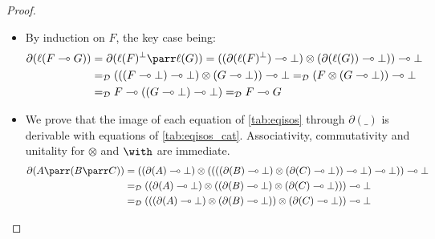 \documentclass{lmcs}
\newcommand*{\orth}{^\perp} %
\newcommand*{\tens}{\otimes} %
\newcommand*{\lolipop}{\multimap} %
\newcommand*{\eqeq}{=} %
\newcommand*{\thD}{\mathcal{D}}
\newcommand*{\isoc}{\eqeq_\thD} %
\newcommand*{\tradm}[1]{\ell(#1)}
\newcommand*{\tradc}[1]{\partial(#1)}
\begin{document}
\begin{proof}
\begin{itemize}
{\begin{align*}
\tradc{(A\oplus B)\orth} &= \tradc{B\orth}\with\tradc{A\orth} \isoc (\tradc{A}\lolipop\bot)\with(\tradc{B}\lolipop\bot) \\
  &\isoc (((\tradc{A}\lolipop\bot)\with(\tradc{B}\lolipop\bot))\lolipop\bot)\lolipop\bot \\
  &= \tradc{A\oplus B}\lolipop\bot \\
\tradc{0\orth} &= \top \isoc (\top\lolipop\bot)\lolipop\bot = \tradc{0}\lolipop\bot \\
\end{align*}
}
\item By induction on $F$, the key case being:
\begin{align*}
\tradc{\tradm{F\lolipop G}} &= \tradc{\tradm{F}\orth\parr\tradm{G}} = ((\tradc{\tradm{F}\orth}\lolipop\bot)\tens(\tradc{\tradm{G}}\lolipop\bot))\lolipop\bot \\
  &\isoc (((F\lolipop\bot)\lolipop\bot)\tens(G\lolipop\bot))\lolipop\bot \isoc (F\tens(G\lolipop\bot))\lolipop\bot\\
  &\isoc F\lolipop((G\lolipop\bot)\lolipop\bot) \isoc F\lolipop G
\end{align*}
\item We prove that the image of each equation of \autoref{tab:eqisos} through $\tradc{\_}$ is derivable with equations of \autoref{tab:eqisos_cat}.
Associativity, commutativity and unitality for $\tens$ and $\with$ are immediate.
{\allowdisplaybreaks
\begin{align*}
\tradc{A\parr(B\parr C)}
  &= ((\tradc{A} \lolipop \bot) \tens ((((\tradc{B} \lolipop \bot) \tens (\tradc{C} \lolipop \bot)) \lolipop \bot) \lolipop \bot)) \lolipop \bot\\
  &\isoc ((\tradc{A} \lolipop \bot) \tens ((\tradc{B} \lolipop \bot) \tens (\tradc{C} \lolipop \bot))) \lolipop \bot\\
  &\isoc (((\tradc{A} \lolipop \bot) \tens (\tradc{B} \lolipop \bot)) \tens (\tradc{C} \lolipop \bot)) \lolipop \bot\\

\end{align*}}
\end{itemize}
\end{proof}
\end{document}
